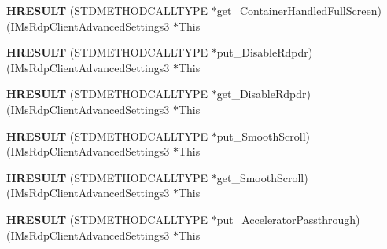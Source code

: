 \begin{DoxyCompactItemize}
\item 
\mbox{\label{struct_i_ms_rdp_client_advanced_settings3_vtbl_a2b115db49229fe76ecd20b9aa827aaa0}} 
{\bfseries H\+R\+E\+S\+U\+LT} (S\+T\+D\+M\+E\+T\+H\+O\+D\+C\+A\+L\+L\+T\+Y\+PE $\ast$get\+\_\+\+Container\+Handled\+Full\+Screen)(I\+Ms\+Rdp\+Client\+Advanced\+Settings3 $\ast$This
\item 
\mbox{\label{struct_i_ms_rdp_client_advanced_settings3_vtbl_a94514a92d781adc8d363081b34cb26d3}} 
{\bfseries H\+R\+E\+S\+U\+LT} (S\+T\+D\+M\+E\+T\+H\+O\+D\+C\+A\+L\+L\+T\+Y\+PE $\ast$put\+\_\+\+Disable\+Rdpdr)(I\+Ms\+Rdp\+Client\+Advanced\+Settings3 $\ast$This
\item 
\mbox{\label{struct_i_ms_rdp_client_advanced_settings3_vtbl_ad8c5c82f0ab94993134ab05092c13e28}} 
{\bfseries H\+R\+E\+S\+U\+LT} (S\+T\+D\+M\+E\+T\+H\+O\+D\+C\+A\+L\+L\+T\+Y\+PE $\ast$get\+\_\+\+Disable\+Rdpdr)(I\+Ms\+Rdp\+Client\+Advanced\+Settings3 $\ast$This
\item 
\mbox{\label{struct_i_ms_rdp_client_advanced_settings3_vtbl_a0bcfc989a9e3332137dc14f6f79be061}} 
{\bfseries H\+R\+E\+S\+U\+LT} (S\+T\+D\+M\+E\+T\+H\+O\+D\+C\+A\+L\+L\+T\+Y\+PE $\ast$put\+\_\+\+Smooth\+Scroll)(I\+Ms\+Rdp\+Client\+Advanced\+Settings3 $\ast$This
\item 
\mbox{\label{struct_i_ms_rdp_client_advanced_settings3_vtbl_a64e5166e840c0a56045747d133b80e08}} 
{\bfseries H\+R\+E\+S\+U\+LT} (S\+T\+D\+M\+E\+T\+H\+O\+D\+C\+A\+L\+L\+T\+Y\+PE $\ast$get\+\_\+\+Smooth\+Scroll)(I\+Ms\+Rdp\+Client\+Advanced\+Settings3 $\ast$This
\item 
\mbox{\label{struct_i_ms_rdp_client_advanced_settings3_vtbl_afd1b713e7a33fe0193a98f814f26c310}} 
{\bfseries H\+R\+E\+S\+U\+LT} (S\+T\+D\+M\+E\+T\+H\+O\+D\+C\+A\+L\+L\+T\+Y\+PE $\ast$put\+\_\+\+Accelerator\+Passthrough)(I\+Ms\+Rdp\+Client\+Advanced\+Settings3 $\ast$This
\item 
\mbox{\label{struct_i_ms_rdp_client_advanced_settings3_vtbl_a040549a23070fc4767b4ea6d33e402b0}} 

\end{DoxyCompactItemize}
